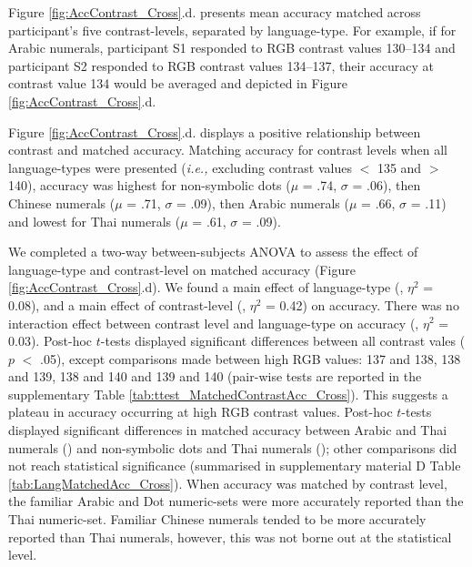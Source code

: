 Figure \ref{fig:AccContrast_Cross}.d. presents mean accuracy matched across participant's five contrast-levels, separated by language-type. For example, if for Arabic numerals, participant S1 responded to RGB contrast values 130--134 and participant S2 responded to RGB contrast values 134--137, their accuracy at contrast value 134 would be averaged and depicted in Figure \ref{fig:AccContrast_Cross}.d. 

Figure \ref{fig:AccContrast_Cross}.d. displays a positive relationship between contrast and matched accuracy. Matching accuracy for contrast levels when all language-types were presented (\emph{i.e.,} excluding contrast values $<$ 135 and $>$ 140), accuracy was highest for non-symbolic dots ($\mu$ = .74, $\sigma$ = .06), then Chinese numerals ($\mu$ = .71, $\sigma$ = .09), then Arabic numerals ($\mu$ = .66, $\sigma$ = .11) and lowest for Thai numerals ($\mu$ = .61, $\sigma$ = .09). 

We completed a two-way between-subjects ANOVA to assess the effect of language-type and contrast-level on matched accuracy (Figure \ref{fig:AccContrast_Cross}.d). We found a main effect of language-type (, $\eta^2$ = 0.08), and a main effect of contrast-level (, $\eta^2$ = 0.42) on accuracy.  There was no interaction effect between contrast level and language-type on accuracy (, $\eta^2$ = 0.03). Post-hoc $t$-tests displayed significant differences between all contrast vales ($p$ $<$ .05), except comparisons made between high RGB values: 137 and 138, 138 and 139, 138 and 140 and 139 and 140 (pair-wise tests are reported in the supplementary Table \ref{tab:ttest_MatchedContrastAcc_Cross}). This suggests a plateau in accuracy occurring at high RGB contrast values. Post-hoc $t$-tests displayed significant differences in matched accuracy between Arabic and Thai numerals () and non-symbolic dots and Thai numerals (); other comparisons did not reach statistical significance (summarised in supplementary material D Table \ref{tab:LangMatchedAcc_Cross}). When accuracy was matched by contrast level, the familiar Arabic and Dot numeric-sets were more accurately reported than the Thai numeric-set. Familiar Chinese numerals tended to be more accurately reported than Thai numerals, however, this was not borne out at the statistical level. 


\pagebreak


